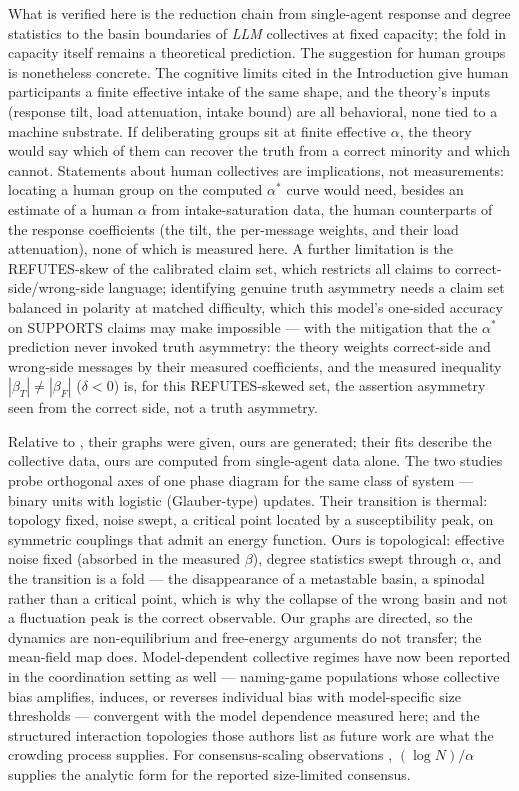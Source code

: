 \documentclass[11pt]{article}
\newcommand{\astar}{\alpha^{*}}
\begin{document}
What is verified here is the reduction chain from single-agent response and
degree statistics to the basin boundaries of \emph{LLM} collectives at fixed
capacity; the fold in capacity itself remains a theoretical prediction.
The suggestion for human groups is nonetheless concrete. The cognitive limits cited in the Introduction give human participants a finite effective intake of the same shape, and the theory's inputs (response tilt, load attenuation, intake bound) are all behavioral, none tied to a machine substrate. If deliberating groups sit at finite effective $\alpha$, the theory would say which of them can recover the truth from a correct minority and which cannot. Statements about human collectives are implications, not measurements:
locating a human group on the computed $\astar$ curve would need, besides an
estimate of a human $\alpha$ from intake-saturation data, the human
counterparts of the response coefficients (the tilt, the per-message weights,
and their load attenuation), none of which is measured here. A further limitation is the
REFUTES-skew of the calibrated claim set, which restricts all claims to
correct-side/wrong-side language; identifying genuine truth asymmetry needs
a claim set balanced in polarity at matched difficulty, which this model's
one-sided accuracy on SUPPORTS claims may make impossible --- with the
mitigation that the $\astar$ prediction never invoked truth asymmetry: the
theory weights correct-side and wrong-side messages by their measured
coefficients, and the measured inequality $|\beta_T| \ne |\beta_F|$
($\delta < 0$) is, for this REFUTES-skewed set, the assertion asymmetry seen
from the correct side, not a truth asymmetry.

Relative to \citet{El2026}, their graphs were given, ours are generated;
their fits describe the collective data, ours are computed from single-agent data alone. The two studies probe
orthogonal axes of one phase diagram for the same class of system --- binary
units with logistic (Glauber-type) updates. Their transition is thermal:
topology fixed, noise swept, a critical point located by a susceptibility
peak, on symmetric couplings that admit an energy function. Ours is
topological: effective noise fixed (absorbed in the measured $\beta$),
degree statistics swept through $\alpha$, and the transition is a fold ---
the disappearance of a metastable basin, a spinodal rather than a critical
point, which is why the collapse of the wrong basin and not a fluctuation peak is the
correct observable. Our graphs are directed, so the dynamics are non-equilibrium and free-energy arguments do not transfer; the mean-field
map does. Model-dependent collective regimes have now been reported in the
coordination setting as well --- naming-game populations whose collective
bias amplifies, induces, or reverses individual bias with model-specific
size thresholds \citep{Flint2026} --- convergent with the model dependence
measured here; and the structured interaction topologies those authors list
as future work are what the crowding process supplies. For
consensus-scaling observations \citep{DeMarzo2024},
$(\log N)/\alpha$ supplies the analytic form for the reported size-limited
consensus.
\end{document}

